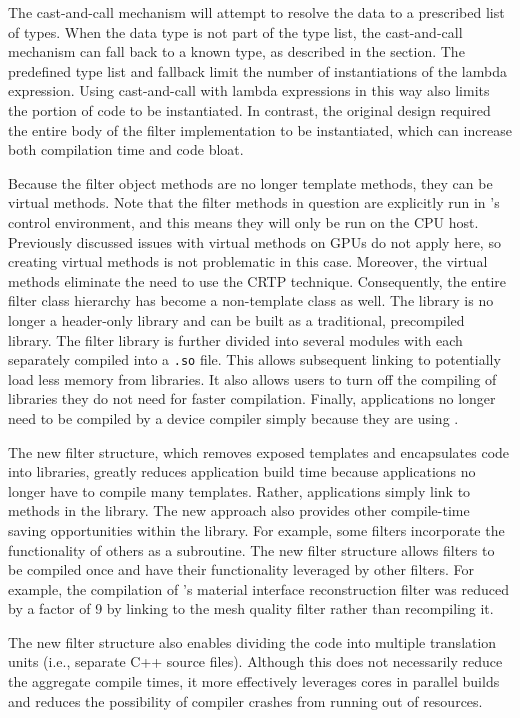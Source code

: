 The cast-and-call mechanism will attempt to resolve the data to a prescribed list of types.
When the data type is not part of the type list, the cast-and-call mechanism can fall back to a known type, as described in the  section.
The predefined type list and fallback limit the number of instantiations of the lambda expression.
Using cast-and-call with lambda expressions in this way also limits the portion of code to be instantiated.
In contrast, the original design required the entire body of the filter implementation to be instantiated, which can increase both compilation time and code bloat.

Because the filter object methods are no longer template methods, they can be virtual methods.
Note that the filter methods in question are explicitly run in \vtkm's control environment, and this means they will only be run on the CPU host.
Previously discussed issues with virtual methods on GPUs do not apply here, so creating virtual methods is not problematic in this case.
Moreover, the virtual methods eliminate the need to use the CRTP technique.
Consequently, the entire filter class hierarchy has become a non-template class as well.
The library is no longer a header-only library and can be built as a traditional, precompiled library.
The filter library is further divided into several modules with each separately compiled into a \texttt{.so} file.
This allows subsequent linking to potentially load less memory from libraries.
It also allows users to turn off the compiling of libraries they do not need for faster compilation.
Finally, applications no longer need to be compiled by a device compiler simply because they are using \vtkm.

The new filter structure, which removes exposed templates and encapsulates code into libraries, greatly reduces application build time because applications no longer have to compile many \vtkm templates.
Rather, applications simply link to methods in the \vtkm library.
The new approach also provides other compile-time saving opportunities within the library.
For example, some filters incorporate the functionality of others as a subroutine.
The new filter structure allows filters to be compiled once and have their functionality leveraged by other filters.
For example, the compilation of \vtkm's material interface reconstruction filter was reduced by a factor of 9 by linking to the mesh quality filter rather than recompiling it.

The new filter structure also enables dividing the code into multiple translation units (i.e., separate C++ source files).
Although this does not necessarily reduce the aggregate compile times, it more effectively leverages cores in parallel builds and reduces the possibility of compiler crashes from running out of resources.


